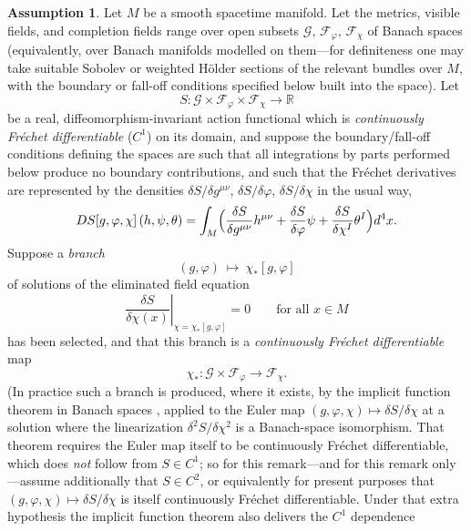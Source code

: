 \documentclass[11pt,reqno]{amsart}
\numberwithin{equation}{section}
\theoremstyle{plain}
\theoremstyle{definition}
\newtheorem{assumption}[theorem]{Assumption}
\theoremstyle{remark}
\begin{document}
\begin{assumption}
\label{ass:gravity}
Let $M$ be a smooth spacetime manifold. Let the metrics, visible fields, and completion fields
range over open subsets $\mathcal{G}$, $\mathcal{F}_{\varphi}$, $\mathcal{F}_{\chi}$ of Banach
spaces (equivalently, over Banach manifolds modelled on them---for definiteness one may take
suitable Sobolev or weighted H\"older sections of the relevant bundles over $M$, with the
boundary or fall-off conditions specified below built into the space). Let
\[
S:\mathcal{G}\times\mathcal{F}_{\varphi}\times\mathcal{F}_{\chi}\longrightarrow\mathbb{R}
\]
be a real, diffeomorphism-invariant action functional which is \emph{continuously Fr\'echet
differentiable} ($C^{1}$) on its domain, and suppose the boundary/fall-off conditions defining
the spaces are such that all integrations by parts performed below produce no boundary
contributions, and such that the Fr\'echet derivatives are represented by the densities
$\delta S/\delta g^{\mu\nu}$, $\delta S/\delta\varphi$, $\delta S/\delta\chi$ in the usual way,
\[
DS[g,\varphi,\chi]\,(h,\psi,\theta)
=\int_{M}\Bigl(\frac{\delta S}{\delta g^{\mu\nu}}h^{\mu\nu}
+\frac{\delta S}{\delta\varphi}\psi
+\frac{\delta S}{\delta\chi^{I}}\theta^{I}\Bigr)d^{4}x .
\]
Suppose a \emph{branch}
\begin{equation}
\label{eq:branch}
(g,\varphi)\ \longmapsto\ \chi_{*}[g,\varphi]
\end{equation}
of solutions of the eliminated field equation
\begin{equation}
\label{eq:chistargrav}
\left.\frac{\delta S}{\delta\chi(x)}\right|_{\chi=\chi_{*}[g,\varphi]}=0
\qquad\text{for all }x\in M
\end{equation}
has been selected, and that this branch is a \emph{continuously Fr\'echet differentiable} map
\[
\chi_{*}:\mathcal{G}\times\mathcal{F}_{\varphi}\longrightarrow\mathcal{F}_{\chi} .
\]
(In practice such a branch is produced, where it exists, by the implicit function theorem in
Banach spaces \cite[Ch.~4]{Zeidler1}, applied to the Euler map
$(g,\varphi,\chi)\mapsto\delta S/\delta\chi$ at a solution where the linearization
$\delta^{2}S/\delta\chi^{2}$ is a Banach-space isomorphism. That theorem requires the Euler map
itself to be continuously Fr\'echet differentiable, which does \emph{not} follow from
$S\in C^{1}$; so for this remark---and for this remark only---assume additionally that
$S\in C^{2}$, or equivalently for present purposes that
$(g,\varphi,\chi)\mapsto\delta S/\delta\chi$ is itself continuously Fr\'echet differentiable.
Under that extra hypothesis the implicit function theorem also delivers the $C^{1}$ dependence

\end{assumption}
\end{document}
